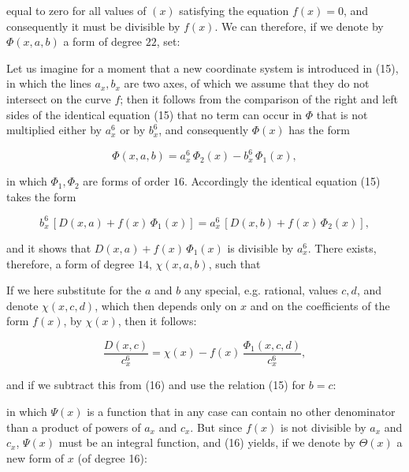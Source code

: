 equal to zero for all values of $(x)$ satisfying the equation $f(x)=0$, and consequently it must be divisible by $f(x)$. We can therefore, if we denote by $\Phi(x,a,b)$ a form of degree $22$, set:


Let us imagine for a moment that a new coordinate system is introduced in (15), in which the lines $a_x, b_x$ are two axes, of which we assume that they do not intersect on the curve $f$; then it follows from the comparison of the right and left sides of the identical equation (15) that no term can occur in $\Phi$ that is not multiplied either by $a_x^6$ or by $b_x^6$, and consequently $\Phi(x)$ has the form

\[
\Phi(x,a,b) = a_x^6\, \Phi_2(x) - b_x^6\, \Phi_1(x),
\]

in which $\Phi_1, \Phi_2$ are forms of order $16$. Accordingly the identical equation (15) takes the form

\[
b_x^6\,[D(x,a) + f(x)\,\Phi_1(x)] = a_x^6\,[D(x,b) + f(x)\,\Phi_2(x)],
\]

and it shows that $D(x,a) + f(x)\,\Phi_1(x)$ is divisible by $a_x^6$. There exists, therefore, a form of degree $14$, $\chi(x,a,b)$, such that


If we here substitute for the $a$ and $b$ any special, e.g. rational, values $c, d$, and denote $\chi(x,c,d)$, which then depends only on $x$ and on the coefficients of the form $f(x)$, by $\chi(x)$, then it follows:

\[
\frac{D(x,c)}{c_x^6} = \chi(x) - f(x)\,\frac{\Phi_1(x,c,d)}{c_x^6},
\]

and if we subtract this from (16) and use the relation (15) for $b=c$:


in which $\Psi(x)$ is a function that in any case can contain no other denominator than a product of powers of $a_x$ and $c_x$. But since $f(x)$ is not divisible by $a_x$ and $c_x$, $\Psi(x)$ must be an integral function, and (16) yields, if we denote by $\Theta(x)$ a new form of $x$ (of degree 16):

